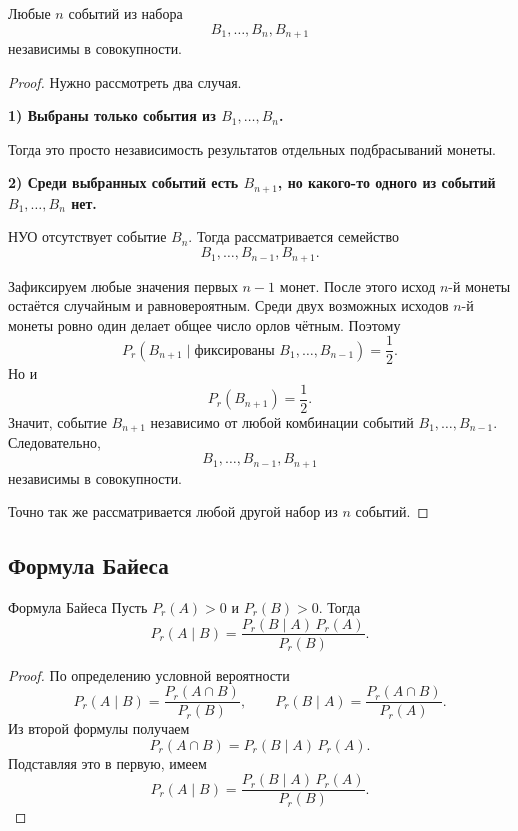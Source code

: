 \begin{Statement}{}{}
	Любые \(n\) событий из набора
	\[
	B_1,\dots,B_n,B_{n+1}
	\]
	независимы в совокупности.
\end{Statement}

\begin{proof}
	Нужно рассмотреть два случая.
	
	\textbf{1) Выбраны только события из \(B_1,\dots,B_n\).}
	
	Тогда это просто независимость результатов отдельных подбрасываний монеты.
	
	\textbf{2) Среди выбранных событий есть \(B_{n+1}\), но какого-то одного из событий \(B_1,\dots,B_n\) нет.}
	
	НУО отсутствует событие \(B_n\). Тогда рассматривается семейство
	\[
	B_1,\dots,B_{n-1},B_{n+1}.
	\]
	
	Зафиксируем любые значения первых \(n-1\) монет. После этого исход \(n\)-й монеты остаётся случайным и равновероятным. Среди двух возможных исходов \(n\)-й монеты ровно один делает общее число орлов чётным. Поэтому
	\[
	P_r(B_{n+1}\mid \text{фиксированы }B_1,\dots,B_{n-1})=\frac12.
	\]
	Но и
	\[
	P_r(B_{n+1})=\frac12.
	\]
	Значит, событие \(B_{n+1}\) независимо от любой комбинации событий \(B_1,\dots,B_{n-1}\). Следовательно,
	\[
	B_1,\dots,B_{n-1},B_{n+1}
	\]
	независимы в совокупности.
	
	Точно так же рассматривается любой другой набор из \(n\) событий.
\end{proof}

\subsection{Формула Байеса}

\begin{Statement}{Формула Байеса}{}
	Пусть \(P_r(A)>0\) и \(P_r(B)>0\). Тогда
	\[
	P_r(A\mid B)=\frac{P_r(B\mid A)\,P_r(A)}{P_r(B)}.
	\]
\end{Statement}

\begin{proof}
	По определению условной вероятности
	\[
	P_r(A\mid B)=\frac{P_r(A\cap B)}{P_r(B)},
	\qquad
	P_r(B\mid A)=\frac{P_r(A\cap B)}{P_r(A)}.
	\]
	Из второй формулы получаем
	\[
	P_r(A\cap B)=P_r(B\mid A)\,P_r(A).
	\]
	Подставляя это в первую, имеем
	\[
	P_r(A\mid B)=\frac{P_r(B\mid A)\,P_r(A)}{P_r(B)}.
	\]
\end{proof}
